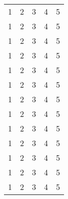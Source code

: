 \documentclass{article}
\begin{document}
\begin{longtable}{lllll}
    1        & 2        & 3        & 4        & 5               \\

    1        & 2        & 3        & 4        & 5               \\

    1        & 2        & 3        & 4        & 5               \\

    1        & 2        & 3        & 4        & 5               \\

    1        & 2        & 3        & 4        & 5               \\

    1        & 2        & 3        & 4        & 5               \\

    1        & 2        & 3        & 4        & 5               \\

    1        & 2        & 3        & 4        & 5               \\

    1        & 2        & 3        & 4        & 5               \\

    1        & 2        & 3        & 4        & 5               \\

    1        & 2        & 3        & 4        & 5               \\

    1        & 2        & 3        & 4        & 5               \\

    1        & 2        & 3        & 4        & 5               \\
\end{longtable}
\end{document}
